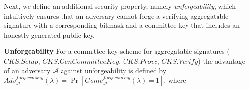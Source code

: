 \noindent Next, we define an additional security property, namely \emph{unforgeability}, which intuitively ensures that an adversary 
cannot forge a verifying aggregatable signature with a corresponding bitmask and a committee key that includes an honestly generated public key.\\
\vspace{-0.05in}

\noindent \textbf{Unforgeability}  For a committee key scheme for aggregatable signatures 
($\mathit{CKS.Setup}$, $\mathit{CKS.GenCommitteeKey}$, $\mathit{CKS.Prove}$, 
$\mathit{CKS.Verify}$) the advantage of an 
adversary $\mathcal{A}$ against unforgeability is defined by \\
$\mathit{Adv}_{\mathcal{A}}^{\mathit{forgecomkey}}(\lambda) = \Pr[\mathit{Game}^{\mathit{forgecomkey}}_{\mathcal{A}}(\lambda) = 1]$, 
where
\begin{comment}
\begin{align*}
& \mathit{Game}^{\mathit{forgecomkey}}_{\mathcal{A}}({\lambda}): \\
& (\mathit{pp}, \mathit{rs}_{\mathit{vk}},\mathit{rs}_{\mathit{pk}}) \leftarrow \mathit{CKS.Setup}(v), \\
&((\mathit{pk}^*,\pi^*_{\mathit{PoP}}), \mathit{sk}^*) \leftarrow \mathit{AS.GenKeypair}(\mathit{pp}), Q \leftarrow \emptyset \\
& ((\mathit{pk_i}, \pi_{\mathit{PoP},i})_{i=1}^{u}, (\mathit{bit_i})_{i=1}^u, \mathit{asig}, \pi, m) \leftarrow \mathcal{A}^{\mathit{OSign}}(\mathit{pp},\mathit{rs}_{\mathit{vk}}, \\ &\mathit{rs}_{\mathit{pk}}, (\mathit{pk^*},\pi^*_{\mathit{PoP}})) \\
&\textit{If } ( i  \in [u], \mathit{pk}^* = \mathit{pk_i} \wedge \mathit{bit_i}=1) \vee m \in Q, \textit{ then return } 0 \\
& \textit{For } i \in [u] 
\end{align*}
\end{comment}
